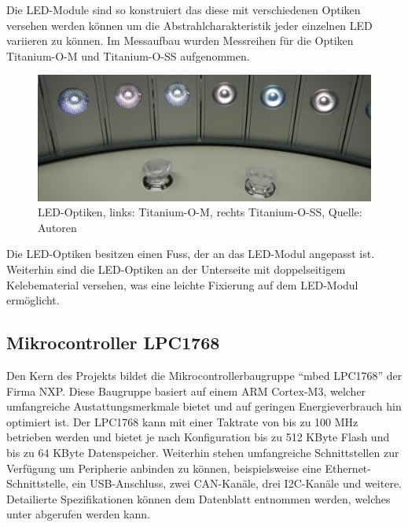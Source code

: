 \documentclass[a4paper,12pt]{scrartcl}
\begin{document}
Die LED-Module sind so konstruiert das diese mit verschiedenen Optiken versehen werden k\"onnen um die Abstrahlcharakteristik jeder einzelnen LED variieren zu
k\"onnen. Im Messaufbau wurden Messreihen f\"ur die Optiken Titanium-O-M und Titanium-O-SS aufgenommen.
\begin{figure}[htb]
\begin{center}
  \includegraphics[width=1\hsize]{./images/foto_hardware_optiken.png}
\end{center}
\caption[LED-Optiken, links: Titanium-O-M, rechts Titanium-O-SS, Quelle:
Autoren]{\label{fotohwoptiken}LED-Optiken, links: Titanium-O-M, rechts Titanium-O-SS, Quelle:
Autoren}
\end{figure}
Die LED-Optiken besitzen einen Fuss, der an das LED-Modul angepasst ist. Weiterhin sind die LED-Optiken an der Unterseite mit doppelseitigem Kelebematerial
versehen, was eine leichte Fixierung auf dem LED-Modul erm\"oglicht.

\subsection{Mikrocontroller LPC1768}
Den Kern des Projekts bildet die Mikrocontrollerbaugruppe "`mbed LPC1768"' der
Firma NXP. Diese Baugruppe basiert auf einem ARM Cortex-M3, welcher umfangreiche
Austattungsmerkmale bietet und auf geringen Energieverbrauch hin optimiert ist.
Der LPC1768 kann mit einer Taktrate von bis zu 100 MHz betrieben werden und
bietet je nach Konfiguration bis zu 512 KByte Flash und bis zu 64 KByte
Datenspeicher. Weiterhin stehen umfangreiche Schnittstellen zur Verfügung um
Peripherie anbinden zu können, beispielsweise eine Ethernet-Schnittstelle, ein
USB-Anschluss, zwei CAN-Kanäle, drei I2C-Kanäle und weitere. Detailierte
Spezifikationen können dem Datenblatt entnommen werden, welches unter
\cite{speclpc1768} abgerufen werden kann.
\end{document}
